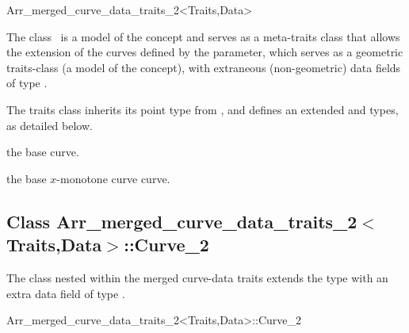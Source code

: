 
\ccRefPageBegin
\begin{ccRefClass}{Arr_merged_curve_data_traits_2<Traits,Data>}

\ccDefinition

The class \ccRefName\ is a model of the  concept
and serves as a meta-traits class that allows the extension of the curves
defined by the  parameter, which serves as a geometric
traits-class (a model of the  concept), with
extraneous (non-geometric) data fields of type .

The traits class inherits its point type from ,
and defines an extended  and  types,
as detailed below.

 
\ccIsModel

\ccInheritsFrom

\ccTypes

    {the base curve.}

    {the base $x$-monotone curve curve.}

\subsection*{Class 
 Arr\_merged\_curve\_data\_traits\_2$<$Traits,Data$>$::Curve\_2}

The  class nested within the merged curve-data traits
extends the  type with an extra data field of type
.

\begin{ccClass}{Arr_merged_curve_data_traits_2<Traits,Data>::Curve_2}

\ccInheritsFrom

\ccCreation
{}


\end{ccClass}
\end{ccRefClass}

